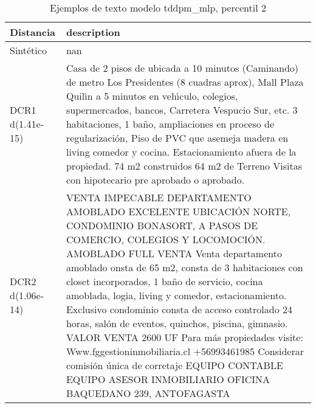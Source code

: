 \begin{table}[H]
\centering
\fontsize{10}{14}\selectfont
\caption{Ejemplos de texto modelo tddpm\_mlp, percentil 2}
\label{table-example-economicos-b-3-tddpm_mlp-2p-text}
\begin{tabular}{|l|m{35em}|}
\hline
\rowcolor[gray]{0.8}
Distancia & description \\
\hline Sintético & nan \\
\hline DCR1 d(1.41e-15) & Casa de 2 pisos de ubicada a 10 minutos (Caminando) de metro Los Presidentes (8 cuadras aprox), Mall Plaza Quil{\'\i}n a 5 minutos en veh{\'\i}culo, colegios, supermercados, bancos, Carretera Vespucio Sur, etc.  3 habitaciones, 1 ba\~no, ampliaciones en proceso de regularizaci\'on, Piso de PVC que asemeja madera en living comedor y cocina. Estacionamiento afuera de la propiedad.  74 m2 construidos 64 m2 de Terreno  Visitas con hipotecario pre aprobado o aprobado. \\
\hline DCR2 d(1.06e-14) & VENTA IMPECABLE DEPARTAMENTO AMOBLADO EXCELENTE UBICACI\'ON NORTE, CONDOMINIO BONASORT, A PASOS DE COMERCIO, COLEGIOS Y LOCOMOCI\'ON. AMOBLADO FULL VENTA Venta departamento amoblado onsta de 65 m2, consta de 3 habitaciones con closet incorporados, 1 ba\~no de servicio, cocina amoblada, logia, living y comedor, estacionamiento. Exclusivo condominio consta de acceso controlado 24 horas, sal\'on de eventos, quinchos, piscina, gimnasio. VALOR VENTA 2600 UF Para m\'as propiedades visite: Www.fggestioninmobiliaria.cl +56993461985 Considerar comisi\'on \'unica de corretaje EQUIPO CONTABLE EQUIPO ASESOR INMOBILIARIO OFICINA BAQUEDANO 239, ANTOFAGASTA \\
\hline
\end{tabular}
\end{table}

